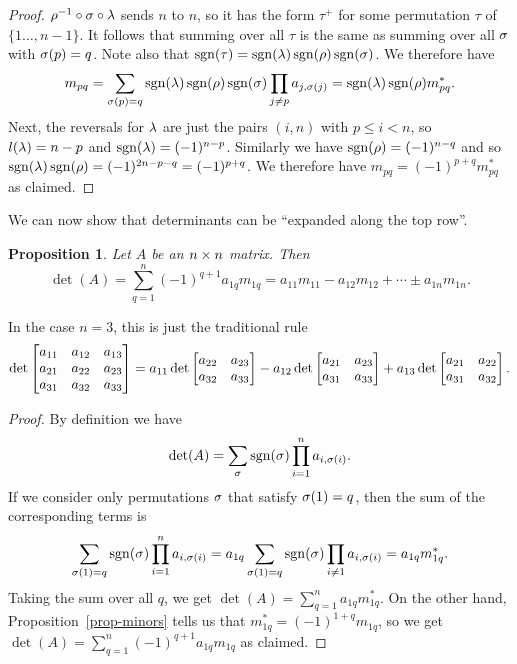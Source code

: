 \documentclass[reqno]{amsart}
\newtheorem{proposition}[theorem]{Proposition}
\theoremstyle{definition}
\begin{document}
\begin{proof}
 $\rho^{-1}\circ\sigma\circ\lambda$ sends $n$ to $n$, so it has the form
 $\tau^+$ for some permutation $\tau$ of $\{1\dotsc,n-1\}$.  It follows
 that summing over all $\tau$ is the same as summing over all $\sigma$
 with $\sigma(p)=q$.  Note also that
 $\operatorname{sgn}(\tau)=\operatorname{sgn}(\lambda)\operatorname{sgn}(\rho)\operatorname{sgn}(\sigma)$.  We therefore have
 \[ m_{pq}
     = \sum_{\sigma(p)=q} \operatorname{sgn}(\lambda)\operatorname{sgn}(\rho)\operatorname{sgn}(\sigma)
        \prod_{j\neq p} a_{j,\sigma(j)}
     = \operatorname{sgn}(\lambda)\operatorname{sgn}(\rho) m^*_{pq}.
 \]
 Next, the reversals for $\lambda$ are just the pairs $(i,n)$ with $p\leq
 i<n$, so $l(\lambda)=n-p$ and $\operatorname{sgn}(\lambda)=(-1)^{n-p}$.  Similarly we have
 $\operatorname{sgn}(\rho)=(-1)^{n-q}$ and so
 $\operatorname{sgn}(\lambda)\operatorname{sgn}(\rho)=(-1)^{2n-p-q}=(-1)^{p+q}$.  We therefore have
 $m_{pq}=(-1)^{p+q}m^*_{pq}$ as claimed.
\end{proof}

We can now show that determinants can be ``expanded along the top
row''.

\begin{proposition}\label{prop-det-expand}
 Let $A$ be an $n\times n$ matrix.  Then
 \[ \det(A) = \sum_{q=1}^n (-1)^{q+1}a_{1q}m_{1q} =
     a_{11} m_{11} - a_{12}m_{12} + \dotsb \pm a_{1n}m_{1n}.
 \]
\end{proposition}

In the case $n=3$, this is just the traditional rule
\[ \det\left[\begin{matrix} a_{11} & a_{12} & a_{13} \\
            a_{21} & a_{22} & a_{23} \\
            a_{31} & a_{32} & a_{33} \end{matrix}\right] =
     a_{11} \det\left[\begin{matrix} a_{22} & a_{23} \\ a_{32} & a_{33} \end{matrix}\right]
    -a_{12} \det\left[\begin{matrix} a_{21} & a_{23} \\ a_{31} & a_{33} \end{matrix}\right]
    +a_{13} \det\left[\begin{matrix} a_{21} & a_{22} \\ a_{31} & a_{32} \end{matrix}\right].
\]

\begin{proof}
 By definition we have
 \[ \det(A) = \sum_\sigma \operatorname{sgn}(\sigma)\prod_{i=1}^n a_{i,\sigma(i)}. \]
 If we consider only permutations $\sigma$ that satisfy $\sigma(1)=q$, then
 the sum of the corresponding terms is
 \[ \sum_{\sigma(1)=q} \operatorname{sgn}(\sigma)\prod_{i=1}^n a_{i,\sigma(i)}
     = a_{1q} \sum_{\sigma(1)=q} \operatorname{sgn}(\sigma)\prod_{i\neq 1} a_{i,\sigma(i)}
     = a_{1q} m^*_{1q}.
 \]
 Taking the sum over all $q$, we get
 $\det(A)=\sum_{q=1}^n a_{1q}m^*_{1q}$.  On the other hand,
 Proposition~\ref{prop-minors} tells us that
 $m^*_{1q}=(-1)^{1+q}m_{1q}$, so we get
 $\det(A)=\sum_{q=1}^n (-1)^{q+1}a_{1q}m_{1q}$ as claimed.
\end{proof}
\end{document}
